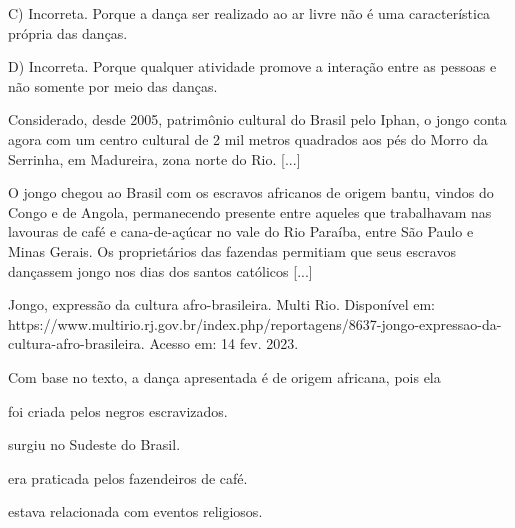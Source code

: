 {{{{{{{{{{{{{{{{{C) Incorreta. Porque a dança ser realizado ao ar livre não é uma
característica própria das danças.

D) Incorreta. Porque qualquer atividade promove a interação entre as
pessoas e não somente por meio das danças.}

\num{}  Considerado, desde 2005, patrimônio cultural do Brasil pelo Iphan, o
  jongo conta agora com um centro cultural de 2 mil metros quadrados aos
  pés do Morro da Serrinha, em Madureira, zona norte do Rio. {[}...{]}

O jongo chegou ao Brasil com os escravos africanos de origem bantu,
vindos do Congo e de Angola, permanecendo presente entre aqueles que
trabalhavam nas lavouras de café e cana-de-açúcar no vale do Rio
Paraíba, entre São Paulo e Minas Gerais. Os proprietários das fazendas
permitiam que seus escravos dançassem jongo nos dias dos santos
católicos {[}...{]}

Jongo, expressão da cultura afro-brasileira. Multi Rio. Disponível em:
https://www.multirio.rj.gov.br/index.php/reportagens/8637-jongo-expressao-da-cultura-afro-brasileira.
Acesso em: 14 fev. 2023.

Com base no texto, a dança apresentada é de origem africana, pois ela

\begin{escolha}
\item foi criada pelos negros escravizados.

\item surgiu no Sudeste do Brasil.

\item era praticada pelos fazendeiros de café.

\item estava relacionada com eventos religiosos.
\end{escolha}

}}}}}}}}}}}}}}}}
